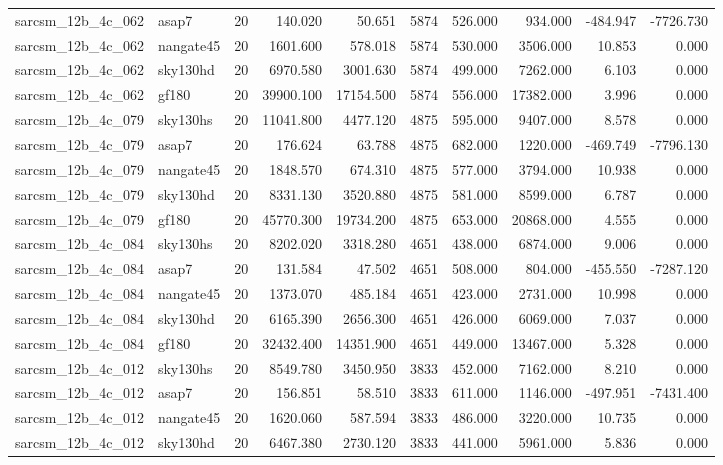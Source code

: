 \begin{tabular}{llrrrrrrrr}
sarcsm\_12b\_4c\_062 & asap7 & 20 & 140.020 & 50.651 & 5874 & 526.000 & 934.000 & -484.947 & -7726.730 \\
sarcsm\_12b\_4c\_062 & nangate45 & 20 & 1601.600 & 578.018 & 5874 & 530.000 & 3506.000 & 10.853 & 0.000 \\
sarcsm\_12b\_4c\_062 & sky130hd & 20 & 6970.580 & 3001.630 & 5874 & 499.000 & 7262.000 & 6.103 & 0.000 \\
sarcsm\_12b\_4c\_062 & gf180 & 20 & 39900.100 & 17154.500 & 5874 & 556.000 & 17382.000 & 3.996 & 0.000 \\
sarcsm\_12b\_4c\_079 & sky130hs & 20 & 11041.800 & 4477.120 & 4875 & 595.000 & 9407.000 & 8.578 & 0.000 \\
sarcsm\_12b\_4c\_079 & asap7 & 20 & 176.624 & 63.788 & 4875 & 682.000 & 1220.000 & -469.749 & -7796.130 \\
sarcsm\_12b\_4c\_079 & nangate45 & 20 & 1848.570 & 674.310 & 4875 & 577.000 & 3794.000 & 10.938 & 0.000 \\
sarcsm\_12b\_4c\_079 & sky130hd & 20 & 8331.130 & 3520.880 & 4875 & 581.000 & 8599.000 & 6.787 & 0.000 \\
sarcsm\_12b\_4c\_079 & gf180 & 20 & 45770.300 & 19734.200 & 4875 & 653.000 & 20868.000 & 4.555 & 0.000 \\
sarcsm\_12b\_4c\_084 & sky130hs & 20 & 8202.020 & 3318.280 & 4651 & 438.000 & 6874.000 & 9.006 & 0.000 \\
sarcsm\_12b\_4c\_084 & asap7 & 20 & 131.584 & 47.502 & 4651 & 508.000 & 804.000 & -455.550 & -7287.120 \\
sarcsm\_12b\_4c\_084 & nangate45 & 20 & 1373.070 & 485.184 & 4651 & 423.000 & 2731.000 & 10.998 & 0.000 \\
sarcsm\_12b\_4c\_084 & sky130hd & 20 & 6165.390 & 2656.300 & 4651 & 426.000 & 6069.000 & 7.037 & 0.000 \\
sarcsm\_12b\_4c\_084 & gf180 & 20 & 32432.400 & 14351.900 & 4651 & 449.000 & 13467.000 & 5.328 & 0.000 \\
sarcsm\_12b\_4c\_012 & sky130hs & 20 & 8549.780 & 3450.950 & 3833 & 452.000 & 7162.000 & 8.210 & 0.000 \\
sarcsm\_12b\_4c\_012 & asap7 & 20 & 156.851 & 58.510 & 3833 & 611.000 & 1146.000 & -497.951 & -7431.400 \\
sarcsm\_12b\_4c\_012 & nangate45 & 20 & 1620.060 & 587.594 & 3833 & 486.000 & 3220.000 & 10.735 & 0.000 \\
sarcsm\_12b\_4c\_012 & sky130hd & 20 & 6467.380 & 2730.120 & 3833 & 441.000 & 5961.000 & 5.836 & 0.000 \\

\end{tabular}
